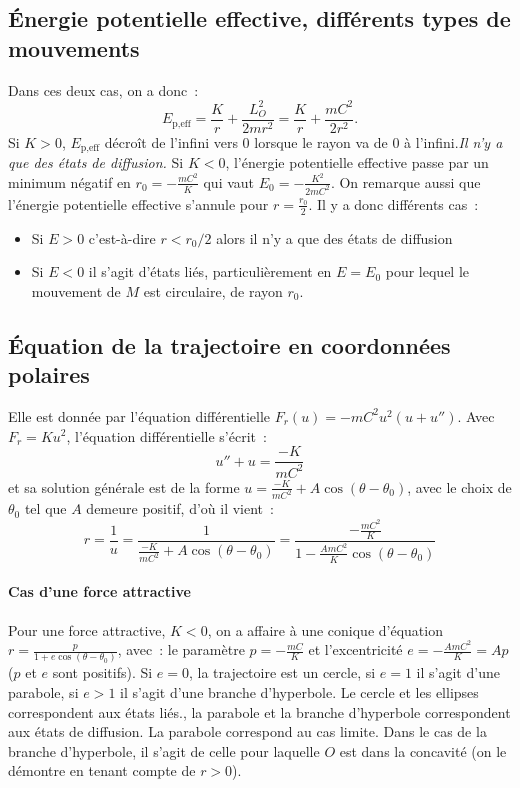 \subsection{Énergie potentielle effective, différents types de mouvements}
Dans ces deux cas, on a donc~:
\begin{equation}
  E_{\text{p,eff}} = \frac{K}{r} + \frac{L_O^2}{2mr^2} = \frac{K}{r} + 
  \frac{mC^2}{2r^2}.
\end{equation}
Si \(K >0\), \(E_{\text{p,eff}}\) décroît de l'infini vers 0 lorsque le rayon va de 0 
à l'infini.\emph{Il n'y a que des états de diffusion.}
Si \(K < 0\), l'énergie potentielle effective passe par un minimum négatif en 
\(r_0 = -\frac{mC^2}{K}\) qui vaut \(E_0 = -\frac{K^2}{2mC^2}\). On remarque 
aussi que l'énergie potentielle effective s'annule pour \(r = \frac{r_0}{2}\).
Il y a donc différents cas~:
\begin{itemize}
  \item Si \(E>0\) c'est-à-dire \(r<r_0/2\) alors il n'y a que des états de 
    diffusion
  \item Si \(E<0\) il s'agit d'états liés, particulièrement en \(E = E_0\) pour 
    lequel le mouvement de \(M\) est circulaire, de rayon \(r_0\).
\end{itemize}
\subsection{Équation de la trajectoire en coordonnées polaires}
Elle est donnée par l'équation différentielle \(F_r(u) = -mC^2u^2(u+u'')\). 
Avec \(F_r = Ku^2\), l'équation différentielle s'écrit~:
\begin{equation}
  u'' + u = \frac{-K}{mC^2}
\end{equation}
et sa solution générale est de la forme \(u = \frac{-K}{mC^2} + 
A\cos(\theta-\theta_0)\), avec le choix de \(\theta_0\) tel que \(A\) demeure 
positif, d'où il vient~:
\begin{equation}
  r = \frac{1}{u} = \frac{1}{\frac{-K}{mC^2} + A\cos(\theta - \theta_0)} = 
  \frac{-\frac{mC^2}{K}}{1 - \frac{AmC^2}{K}\cos(\theta - \theta_0)}
\end{equation}
\paragraph{Cas d'une force attractive}
Pour une force attractive, \(K < 0\), on a affaire à une conique d'équation \(r 
= \frac{p}{1 + e\cos(\theta - \theta_0)}\), avec~: le paramètre \(p = 
-\frac{mC}{K}\) et l'excentricité \(e = -\frac{AmC^2}{K} = Ap\) (\(p\) et \(e\) 
sont positifs). Si \(e=0\), la trajectoire est un cercle, si \(e=1\) il s'agit 
d'une parabole, si \(e>1\) il s'agit d'une branche d'hyperbole. Le cercle et 
les ellipses correspondent aux états liés., la parabole et la branche 
d'hyperbole correspondent aux états de diffusion. La parabole correspond au cas 
limite. Dans le cas de la branche d'hyperbole, il s'agit de celle pour laquelle 
\(O\) est dans la concavité (on le démontre en tenant compte de \(r>0\)).
